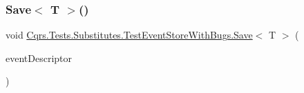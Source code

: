 \subsubsection{\texorpdfstring{Save$<$ T $>$()}{Save< T >()}}
{\footnotesize\ttfamily void \hyperlink{classCqrs_1_1Tests_1_1Substitutes_1_1TestEventStoreWithBugs_ae2208808270f6f4b20856f04b5693f2c_ae2208808270f6f4b20856f04b5693f2c}{Cqrs.\+Tests.\+Substitutes.\+Test\+Event\+Store\+With\+Bugs.\+Save}$<$ T $>$ (\begin{DoxyParamCaption}\item[{\hyperlink{interfaceCqrs_1_1Events_1_1IEvent}{I\+Event}$<$ \hyperlink{interfaceCqrs_1_1Authentication_1_1ISingleSignOnToken}{I\+Single\+Sign\+On\+Token} $>$}]{event\+Descriptor }\end{DoxyParamCaption})}

